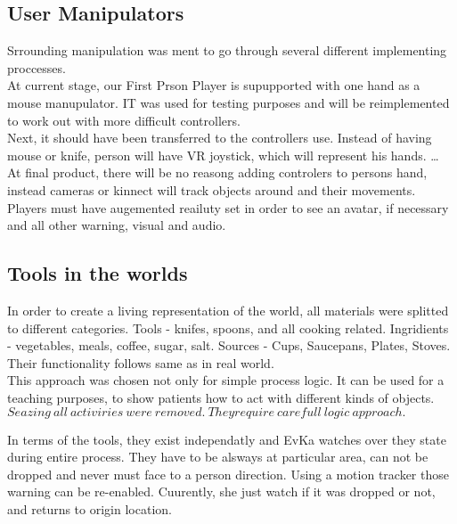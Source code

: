 \documentclass[18pt]{article}
\numberwithin{equation}{section} %
\numberwithin{figure}{section} %
\numberwithin{table}{section} %
\begin{document}
	\subsection{User Manipulators}
	Srrounding manipulation was ment to go through several different implementing proccesses.\\
	
	At current stage, our First Prson Player is supupported with one hand as a mouse manupulator. IT was used for testing purposes and will be reimplemented to work out with more difficult controllers. \\
	
	Next, it should have been transferred to the controllers use. Instead of having mouse or knife, person will have VR joystick, which will represent his hands. \ldots \\
	
	At final product, there will be no reasong adding controlers to persons hand, instead cameras or kinnect will track objects around and their movements.  Players must have augemented reailuty set in order to see an avatar, if necessary and all other warning, visual and audio.\\
	
	
	\subsection{Tools in the worlds}
	In order to create a living representation of the world, all materials were splitted to different categories. Tools - knifes, spoons, and all cooking related. Ingridients - vegetables, meals, coffee, sugar, salt. Sources - Cups, Saucepans, Plates, Stoves. Their functionality follows same as in real world. \\

	This approach was chosen not only for simple process logic. It can be used for a teaching purposes, to show patients how to act with different kinds of objects. \\
	
	$ Seazing\ all\ activiries\ were\ removed.\ They require\ carefull\ logic\ approach. $
	
	In terms of the tools, they exist independatly and EvKa watches over they state during entire process. They have to be alsways at particular area, can not be dropped and never must face to a person direction. Using a motion tracker those warning can be re-enabled. Cuurently, she just watch if it was dropped or not, and returns to origin location. \\
	
\end{document}
